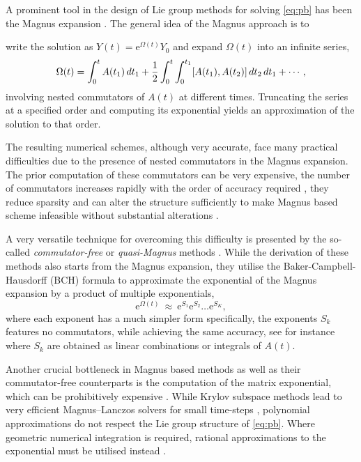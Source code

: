 \documentclass{article}
\newcommand{\diff}{\,{\rm d}}
\newcommand{\Om}{\Omega}
\begin{document}
A prominent tool in the design of Lie group methods for solving \eqref{eq:pb} has been the Magnus expansion \cite{IMNZ:2000, Magnus1954}. 
The general idea of the Magnus approach is to {write the solution as $Y(t) = \mathrm{e}^{\Om(t)}Y_0$ and expand $\Om(t)$ into an infinite series, 
%
\[
\Om(t) = \int_0^t A(t_1) \diff t_1 + \frac{1}{2} \int_0^t \int_0^{t_1} [A(t_1), A(t_2)] \diff t_2 \diff t_1 + \cdots,
\]
%
involving nested commutators of $A(t)$ at different times.
%
Truncating the series at a specified order and computing its exponential yields an approximation of the solution to that order.
%

The resulting numerical schemes, although very accurate, face many practical difficulties due to the presence of nested commutators in the Magnus expansion. The prior computation of these commutators can be very expensive, the number of commutators increases rapidly with the order of accuracy required \cite{MO1999}, they reduce sparsity \cite{ADHHJ2022} and can alter the structure sufficiently to make Magnus based scheme infeasible without substantial alterations \cite{CFBS2023}.

A very versatile technique for overcoming this difficulty is presented by the so-called  {\em commutator-free} or {\em quasi-Magnus} methods \cite{AF:2011, BM2006, CCLMO2022}.
While the derivation of these methods also starts from the Magnus expansion, they utilise the Baker-Campbell-Hausdorff (BCH) formula \cite{Hall2003, Oteo1991} to approximate the exponential of the Magnus expansion by a product of multiple exponentials, 
%
\begin{equation}
\label{eq:comm free form}
\mathrm{e}^{\Om(t)}\ \approx\ \mathrm{e}^{S_1}\mathrm{e}^{S_2}\ldots \mathrm{e}^{S_K},
\end{equation}
%
where each exponent has a much simpler form specifically, the exponents $S_k$ features no commutators, while achieving the same accuracy, see for instance \cite{AF:2011, BM2006} where  $S_k$ are obtained as linear combinations or integrals of $A(t)$. 

Another crucial bottleneck in Magnus based methods as well as their commutator-free counterparts is the computation of the matrix exponential, which can be prohibitively expensive \cite{MV}. While Krylov subspace methods lead to very efficient Magnus--Lanczos solvers for small time-steps \cite{IKP, KHK2008}, polynomial approximations do not respect the Lie group structure of \eqref{eq:pb}. Where geometric numerical integration is required, rational approximations to the exponential must be utilised instead \cite{JS2023}. 

}
\end{document}

